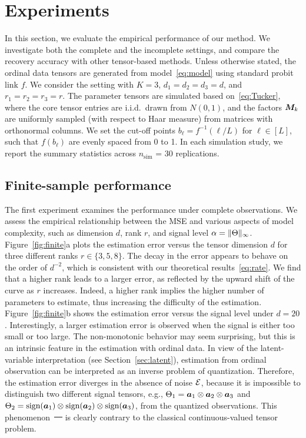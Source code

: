 \documentclass[11pt]{article}
\theoremstyle{plain}
\theoremstyle{definition}
\providecommand{\DIFaddtex}[1]{{\protect\color{blue}\uwave{#1}}} %
\providecommand{\DIFdeltex}[1]{{\protect\color{red}\sout{#1}}}                      %
\providecommand{\DIFaddbegin}{} %
\providecommand{\DIFaddend}{} %
\providecommand{\DIFdelbegin}{} %
\providecommand{\DIFdelend}{} %
\providecommand{\DIFadd}[1]{\texorpdfstring{\DIFaddtex{#1}}{#1}} %
\providecommand{\DIFdel}[1]{\texorpdfstring{\DIFdeltex{#1}}{}} %
\begin{document}
\section{Experiments}\label{sec:experiment}
In this section, we evaluate the empirical performance of our method. We investigate both the complete and the incomplete settings, and compare the recovery accuracy with other tensor-based methods. Unless otherwise stated, the ordinal data tensors are generated from model~\eqref{eq:model} using standard probit link $f$. We consider the setting with $K=3$, $d_1=d_2=d_3=d$, and $r_1=r_2=r_3=r$. The parameter tensors are simulated based on~\eqref{eq:Tucker}, where the core tensor entries are i.i.d.\ drawn from $N(0,1)$, and the factors $\bm M_k$ are uniformly sampled (with respect to Haar measure) from matrices with orthonormal columns. We set the cut-off points $b_\ell=f^{-1}(\ell/L)$ for $\ell\in[L]$, such that $f(b_\ell)$ are evenly spaced from 0 to 1. In each simulation study, we report the summary statistics across $n_{\text{sim}}$ = 30 replications.

\subsection{Finite-sample performance}\label{sec:simulation}
The first experiment examines the performance under complete observations. We assess the empirical relationship between the MSE and various aspects of model complexity, such as dimension $d$, rank $r$, and signal level $\alpha=\lVert\Theta\rVert_\infty$. Figure~\ref{fig:finite}a plots the estimation error versus the tensor dimension $d$ for three different ranks $r\in\{3,5,8\}$. The decay in the error appears to behave on the order of $d^{-2}$, which is consistent with our theoretical results~\eqref{eq:rate}. We find that a higher rank leads to a larger error, as reflected by the upward shift of the curve as $r$ increases. Indeed, a higher rank implies the higher number of parameters to estimate, thus increasing the difficulty of the estimation. Figure~\ref{fig:finite}b shows the estimation error versus the signal level under $d=20$. Interestingly, a larger estimation error is observed when the signal is either too small or too large. The non-monotonic behavior may seem surprising, but this is an intrinsic feature in the estimation with ordinal data. In view of the latent-variable interpretation (see Section~\ref{sec:latent}), estimation from ordinal observation can be interpreted as an inverse problem of quantization. Therefore, the estimation error diverges in the absence of noise $\mathcal{E}$, because it is impossible to distinguish two different signal tensors, e.g., $\Theta_1=\bm{a}_1\otimes \bm{a}_2\otimes \bm{a}_3$ and $\Theta_2=\text{sign}(\bm{a}_1)\otimes \text{sign}(\bm{a}_2)\otimes \text{sign}(\bm{a}_3)$, from the quantized observations. This phenomenon~\DIFdelbegin \DIFdel{\mbox{%
\cite{davenport2014,sur2019modern} }%
}\DIFdelend \DIFaddbegin \DIFadd{\mbox{%
\citep{davenport2014,sur2019modern} }%
}\DIFaddend is clearly contrary to the classical continuous-valued tensor problem.
\end{document}
